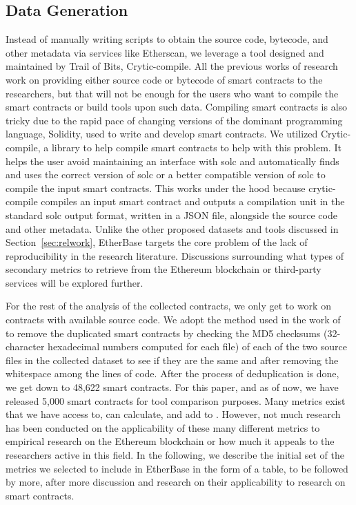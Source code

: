     \subsection{Data Generation}
        Instead of manually writing scripts to obtain the source code, bytecode, and other metadata via services like Etherscan, we leverage a tool designed and maintained by Trail of Bits, Crytic-compile.
        All the previous works of research work on providing either source code or bytecode of smart contracts to the researchers, but that will not be enough for the users who want to compile the smart contracts or build tools upon such data.
        Compiling smart contracts is also tricky due to the rapid pace of changing versions of the dominant programming language, Solidity, used to write and develop smart contracts.
        We utilized Crytic-compile, a library to help compile smart contracts to help with this problem.
        It helps the user avoid maintaining an interface with solc and automatically finds and uses the correct version of solc or a better compatible version of solc to compile the input smart contracts.
        This works under the hood because crytic-compile compiles an input smart contract and outputs a compilation unit in the standard solc output format, written in a JSON file, alongside the source code and other metadata.
        Unlike the other proposed datasets and tools discussed in Section~\ref{sec:relwork}, EtherBase targets the core problem of the lack of reproducibility in the research literature.
        Discussions surrounding what types of secondary metrics to retrieve from the Ethereum blockchain or third-party services will be explored further.
        
        For the rest of the analysis of the collected contracts, we only get to work on contracts with available source code.
        We adopt the method used in the work of ~\cite{deduplicate} to remove the duplicated smart contracts by checking the MD5 checksums (32-character hexadecimal numbers computed for each file) of each of the two source files in the collected dataset to see if they are the same and after removing the whitespace among the lines of code.
        After the process of deduplication is done, we get down to 48,622 smart contracts.
        For this paper, and as of now, we have released 5,000 smart contracts for tool comparison purposes.
        Many metrics exist that we have access to, can calculate, and add to \etherbase. However, not much research has been conducted on the applicability of these many different metrics to empirical research on the Ethereum blockchain or how much it appeals to the researchers active in this field.
        In the following, we describe the initial set of the metrics we selected to include in EtherBase in the form of a table, to be followed by more,
        after more discussion and research on their applicability to research on smart contracts.

